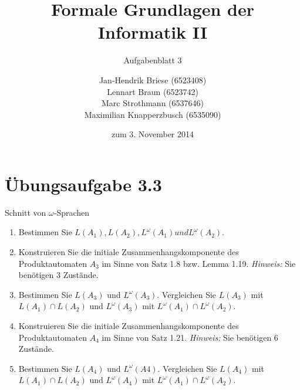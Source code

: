 \documentclass[a4paper]{scrartcl}
\title{Formale Grundlagen der Informatik II}
\subtitle{Aufgabenblatt 3}
\author{
    Jan-Hendrik Briese (6523408) \\
    Lennart Braun (6523742) \\
    Marc Strothmann (6537646) \\
    Maximilian Knapperzbusch (6535090)
}
\date{zum 3. November 2014}
\begin{document}
\maketitle

\section*{Übungsaufgabe 3.3} 
Schnitt von $\omega$-Sprachen
\begin{enumerate}[1.]
    \item Bestimmen Sie $L(A_1 ), L(A_2 ), L^{\omega}(A_1 ) und L^{\omega}(A_2 )$.
    \item Konstruieren Sie die initiale Zusammenhangskomponente des Produktautomaten 
        $A_3$ im Sinne von Satz 1.8 bzw. Lemma 1.19. \textit{Hinweis:} Sie benötigen 
        3 Zustände.
    \item Bestimmen Sie $L(A_3)$ und $L^{\omega}(A_3)$. Vergleichen Sie $L(A_3)$ mit 
        $L(A_1) \cap L(A_2)$ und $L^{\omega}(A_3)$ mit $L^{\omega}(A_1) \cap L^{\omega}(A_2)$.
    \item Konstruieren Sie die initiale Zusammenhangskomponente des Produktautomaten 
        $A_4$ im Sinne von Satz 1.21. \textit{Hinweis:} Sie benötigen 6 Zustände.
    \item Bestimmen Sie $L(A_4)$ und $L^{\omega}(A 4 )$. Vergleichen Sie $L(A_4)$ mit 
        $L(A_1) \cap L(A_2)$ und $L^{\omega}(A_4)$ mit $L^{\omega}(A_1) \cap L^{\omega}(A_2)$.
\end{enumerate}
\end{document}
